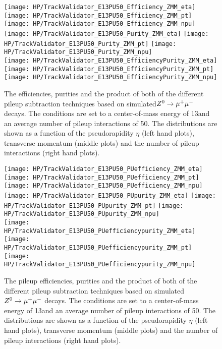\begin{figure}[!h]
  \centering
  \texttt{[image: HP/TrackValidator\_E13PU50\_Efficiency\_ZMM\_eta]}
  \texttt{[image: HP/TrackValidator\_E13PU50\_Efficiency\_ZMM\_pt]}
  \texttt{[image: HP/TrackValidator\_E13PU50\_Efficiency\_ZMM\_npu]}
   \\
  \texttt{[image: HP/TrackValidator\_E13PU50\_Purity\_ZMM\_eta]}
  \texttt{[image: HP/TrackValidator\_E13PU50\_Purity\_ZMM\_pt]}
  \texttt{[image: HP/TrackValidator\_E13PU50\_Purity\_ZMM\_npu]}
   \\
  \texttt{[image: HP/TrackValidator\_E13PU50\_EfficiencyPurity\_ZMM\_eta]}
  \texttt{[image: HP/TrackValidator\_E13PU50\_EfficiencyPurity\_ZMM\_pt]}
  \texttt{[image: HP/TrackValidator\_E13PU50\_EfficiencyPurity\_ZMM\_npu]}
  \caption[Efficiencies, purities and their product of the different pileup subtraction techniques based $\Zz\rightarrow\MM$ decays with 13\TeV and $\left<PU\right>=50$]{The efficiencies, purities and the product of both of the different pileup subtraction techniques based on simulated$\Zz\rightarrow\MM$ decays. The conditions are set to a center-of-mass energy of 13\TeV and an average number of pileup interactions of 50. The distributions are shown as a function of the pseudorapidity $\eta$ (left hand plots), transverse momentum (middle plots) and the number of pileup interactions (right hand plots).}
\end{figure}
\clearpage

\begin{figure}[!h]
  \centering
  \texttt{[image: HP/TrackValidator\_E13PU50\_PUefficiency\_ZMM\_eta]}
  \texttt{[image: HP/TrackValidator\_E13PU50\_PUefficiency\_ZMM\_pt]}
  \texttt{[image: HP/TrackValidator\_E13PU50\_PUefficiency\_ZMM\_npu]}
   \\
  \texttt{[image: HP/TrackValidator\_E13PU50\_PUpurity\_ZMM\_eta]}
  \texttt{[image: HP/TrackValidator\_E13PU50\_PUpurity\_ZMM\_pt]}
  \texttt{[image: HP/TrackValidator\_E13PU50\_PUpurity\_ZMM\_npu]}
   \\
  \texttt{[image: HP/TrackValidator\_E13PU50\_PUefficiencypurity\_ZMM\_eta]}
  \texttt{[image: HP/TrackValidator\_E13PU50\_PUefficiencypurity\_ZMM\_pt]}
  \texttt{[image: HP/TrackValidator\_E13PU50\_PUefficiencypurity\_ZMM\_npu]}
  \caption[Pileup efficiencies, purities and their product of the different pileup subtraction techniques based $\Zz\rightarrow\MM$ decays with 13\TeV and $\left<PU\right>=50$]{The pileup efficiencies, purities and the product of both of the different pileup subtraction techniques based on simulated$\Zz\rightarrow\MM$ decays. The conditions are set to a center-of-mass energy of 13\TeV and an average number of pileup interactions of 50. The distributions are shown as a function of the pseudorapidity $\eta$ (left hand plots), transverse momentum (middle plots) and the number of pileup interactions (right hand plots).}
\end{figure}
\clearpage


